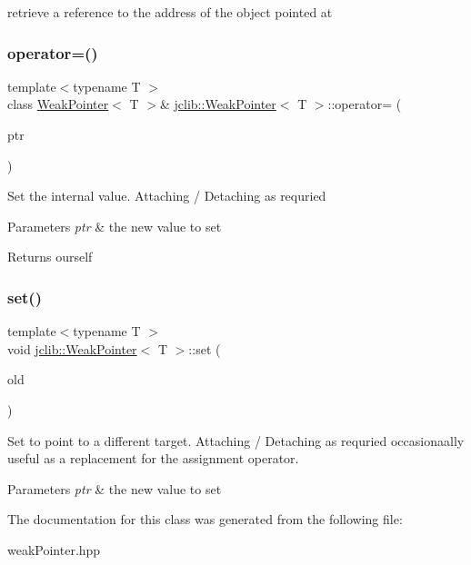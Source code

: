 retrieve a reference to the address of the object pointed at \mbox{\label{classjclib_1_1WeakPointer_a9def3bcb6fee153227e00389cdc8d5b7}} 
\subsubsection{\texorpdfstring{operator=()}{operator=()}}
{\footnotesize\ttfamily template$<$typename T $>$ \\
class \hyperlink{classjclib_1_1WeakPointer}{Weak\+Pointer}$<$ T $>$\& \hyperlink{classjclib_1_1WeakPointer}{jclib\+::\+Weak\+Pointer}$<$ T $>$\+::operator= (\begin{DoxyParamCaption}\item[{const \hyperlink{classjclib_1_1WeakPointer}{Weak\+Pointer}$<$ T $>$ \&}]{ptr }\end{DoxyParamCaption})\hspace{0.3cm}{\ttfamily [inline]}}

Set the internal value. Attaching / Detaching as requried 
\begin{DoxyParams}{Parameters}
{\em ptr} & the new value to set \\
\hline
\end{DoxyParams}
\begin{DoxyReturn}{Returns}
ourself 
\end{DoxyReturn}
\mbox{\label{classjclib_1_1WeakPointer_a7de963c695578295c0c1b545b664d405}} 
\subsubsection{\texorpdfstring{set()}{set()}}
{\footnotesize\ttfamily template$<$typename T $>$ \\
void \hyperlink{classjclib_1_1WeakPointer}{jclib\+::\+Weak\+Pointer}$<$ T $>$\+::set (\begin{DoxyParamCaption}\item[{const \hyperlink{classjclib_1_1WeakPointer}{Weak\+Pointer}$<$ T $>$ \&}]{old }\end{DoxyParamCaption})\hspace{0.3cm}{\ttfamily [inline]}}

Set to point to a different target. Attaching / Detaching as requried occasionaally useful as a replacement for the assignment operator. 
\begin{DoxyParams}{Parameters}
{\em ptr} & the new value to set \\
\hline
\end{DoxyParams}


The documentation for this class was generated from the following file\+:\begin{DoxyCompactItemize}
\item 
weak\+Pointer.\+hpp\end{DoxyCompactItemize}
